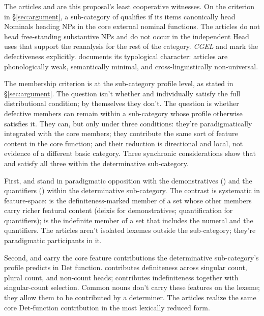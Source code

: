 \documentclass[12pt]{article}
\begin{document}
The articles  and  are this proposal's least cooperative witnesses. On the criterion in §\ref{sec:argument}, a sub-category of  qualifies if its items canonically head Nominals heading NPs in the core external nominal functions. The articles do not head free-standing substantive NPs and do not occur in the independent Head uses that support the reanalysis for the rest of the category. \textit{CGEL} \citep[371--2]{huddleston2002} and \textcite[22--23]{Payne2007} mark the defectiveness explicitly. \textcite{lyons1999} documents its typological character: articles are phonologically weak, semantically minimal, and cross-linguistically non-universal.

The membership criterion is at the sub-category profile level, as stated in §\ref{sec:argument}. The question isn't whether  and  individually satisfy the full distributional condition; by themselves they don't. The question is whether defective members can remain within a sub-category whose profile otherwise satisfies it. They can, but only under three conditions: they're paradigmatically integrated with the core members; they contribute the same sort of feature content in the core function; and their reduction is directional and local, not evidence of a different basic category. Three synchronic considerations show that  and  satisfy all three within the determinative sub-category.

First,  and  stand in paradigmatic opposition with the demonstratives () and the quantifiers () within the determinative sub-category. The contrast is systematic in feature-space:  is the definiteness-marked member of a set whose other members carry richer featural content (deixis for demonstratives; quantification for quantifiers);  is the indefinite member of a set that includes the numeral  and the quantifiers. The articles aren't isolated lexemes outside the sub-category; they're paradigmatic participants in it.

Second,  and  carry the core feature contributions the determinative sub-category's profile predicts in Det function.  contributes definiteness across singular count, plural count, and non-count heads;  contributes indefiniteness together with singular-count selection. Common nouns don't carry these features on the lexeme; they allow them to be contributed by a determiner. The articles realize the same core Det-function contribution in the most lexically reduced form.
\end{document}
